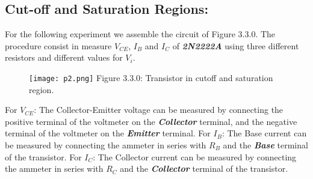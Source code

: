 \subsection{Cut-off and Saturation Regions:}

For the following experiment we assemble the circuit of Figure 3.3.0. The procedure consist in measure $V_{CE}$, $I_{B}$ and $I_{C}$ of {\bfseries\itshape 2N2222A} using three different resistors and different values for $V_{i}$. \hfill \break

{\bfseries\itshape\color{carmine}{Observation:}} {\itshape\color{carmine}{For each circuit we will explain which resistors and voltage were used.}} \hfill \break

\begin{multicols}{2}
\begin{figure}[H]
\texttt{[image: p2.png]}
\centering \linebreak \linebreak Figure 3.3.0: Transistor in cutoff and saturation region.
\end{figure}

\begin{tasks}
\task For $V_{CE}$: The Collector-Emitter voltage can be measured by connecting the positive terminal of the voltmeter on the {\bfseries\itshape Collector} terminal, and the negative terminal of the voltmeter on the {\bfseries\itshape Emitter} terminal.
\task For $I_{B}$: The Base current can be measured by connecting the ammeter in series with {\bfseries\itshape $R_{B}$} and the {\bfseries\itshape Base} terminal of the transistor.
\task For $I_{C}$: The Collector current can be measured by connecting the ammeter in series with {\bfseries\itshape $R_{C}$} and the {\bfseries\itshape Collector} terminal of the transistor.
\end{tasks}
\end{multicols} \hfill \break

